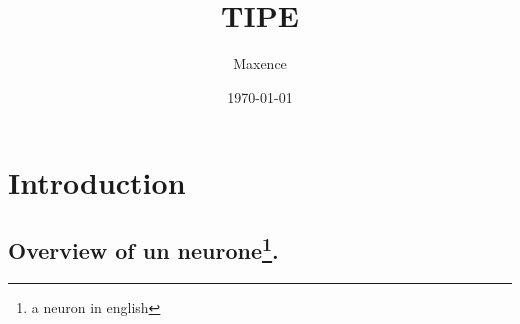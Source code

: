\documentclass{beamer}
\title{TIPE}
\author{Maxence}
\date{\today}
\begin{document}
\frame{\titlepage}

\section[Outline]{}
\frame{\tableofcontents}

\section{Introduction}
\subsection{Overview of un neurone\footnote{a neuron in english}.}
\frame{}
\end{document}

